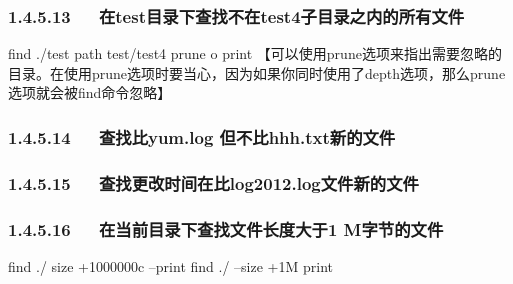 \documentclass[letterpaper,12pt,english]{sphinxmanual}
\begin{document}
\subsubsection{1.4.5.13   在test目录下查找不在test4子目录之内的所有文件}
\label{\detokenize{001software/001install/linux:testtest4}}
\begin{sphinxVerbatim}[commandchars=\\\{\}]
find ./test \PYGZhy{}path \PYGZdq{}test/test4\PYGZdq{} \PYGZhy{}prune \PYGZhy{}o \PYGZhy{}print
【可以使用\PYGZhy{}prune选项来指出需要忽略的目录。在使用\PYGZhy{}prune选项时要当心，因为如果你同时使用了\PYGZhy{}depth选项，那么\PYGZhy{}prune选项就会被find命令忽略】
\end{sphinxVerbatim}


\subsubsection{1.4.5.14   查找比yum.log 但不比hhh.txt新的文件}
\label{\detokenize{001software/001install/linux:yum-log-hhh-txt}}
\begin{sphinxVerbatim}[commandchars=\\\{\}]
\PYG{p}{[} \PYG{p}{]}
\end{sphinxVerbatim}


\subsubsection{1.4.5.15   查找更改时间在比log2012.log文件新的文件}
\label{\detokenize{001software/001install/linux:log2012-log}}
\begin{sphinxVerbatim}[commandchars=\\\{\}]
   
\end{sphinxVerbatim}


\subsubsection{1.4.5.16   在当前目录下查找文件长度大于1 M字节的文件}
\label{\detokenize{001software/001install/linux:m}}
\begin{sphinxVerbatim}[commandchars=\\\{\}]
find ./ \PYGZhy{}size +1000000c –print
find ./ –size +1M \PYGZhy{}print
\end{sphinxVerbatim}
\end{document}
